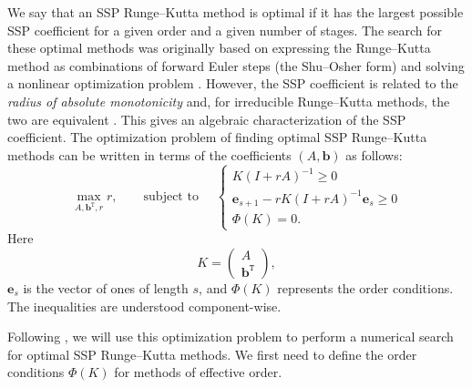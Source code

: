 We say that an SSP Runge--Kutta method is optimal if it has the largest possible SSP coefficient for a given order and a given number of stages.
The search for these optimal methods was originally based on expressing the Runge--Kutta method as combinations of forward Euler steps (the Shu--Osher form) and solving a nonlinear optimization problem \cite{Gottlieb1998, Gottlieb2001, Spiteri2003a, Spiteri2003b, Ruuth2004}.
However, the SSP coefficient is related to the \emph{radius of absolute monotonicity} \cite{Kraaijevanger1991} and, for irreducible Runge--Kutta methods, the two are equivalent \cite{Ferracina2004, Higueras2004}.
This gives an algebraic characterization of the SSP coefficient.
The optimization problem of finding optimal SSP Runge--Kutta methods can be written in terms of the coefficients
$(A,\bm{b})$ as follows:
\begin{equation}\label{eqSSPopt}
    \max_{A, \bm{b}^{\texttt{T}}, r} r, \qquad \text{subject to } \quad \left\{
                                                 \begin{array}{ll}
                                                   K(I + rA)^{-1} \geq 0 \\
                                                   \bm{e}_{s+1} - rK(I + rA)^{-1}\bm{e}_{s} \geq 0 \\
                                                   \Phi(K) = 0.
                                                 \end{array}
                                               \right.
\end{equation}
Here
\begin{equation}\label{eqKmat}
    K = \left(
            \begin{array}{c}
                     A              \\
                     \textbf{b}^{\texttt{T}}
            \end{array}
         \right),
\end{equation}
\( \bm{e}_s \) is the vector of ones of length $s$,
and \( \Phi(K) \) represents the  order conditions.
The inequalities are understood component-wise.

Following \cite{Ketcheson2008, Ketcheson2009}, we will use this optimization problem to perform a numerical search for optimal SSP Runge--Kutta methods.
We first need to define the order conditions $\Phi(K)$ for methods of effective order.

